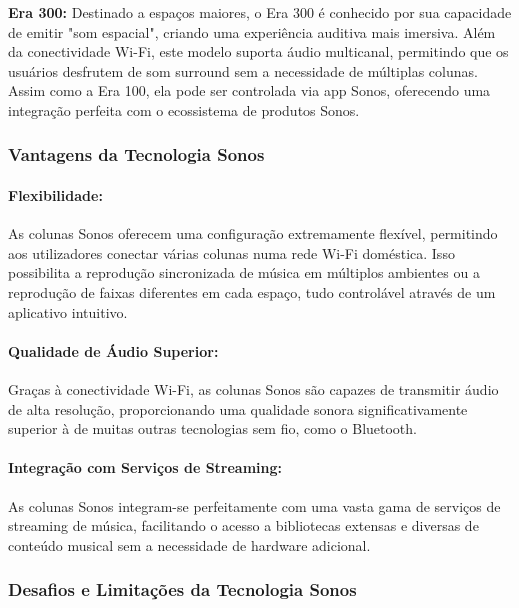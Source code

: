 \documentclass{article}
\begin{document}
\vspace{0.2cm}

\textbf{Era 300:} Destinado a espaços maiores, o Era 300 é conhecido por sua capacidade de emitir "som espacial", criando uma experiência auditiva mais imersiva. Além da conectividade Wi-Fi, este modelo suporta áudio multicanal, permitindo que os usuários desfrutem de som surround sem a necessidade de múltiplas colunas. Assim como a Era 100, ela pode ser controlada via app Sonos, oferecendo uma integração perfeita com o ecossistema de produtos Sonos.
\vspace{1cm}

\subsubsection{Vantagens da Tecnologia Sonos}
\vspace{0.2cm}
\paragraph{Flexibilidade:} As colunas Sonos oferecem uma configuração extremamente flexível, permitindo aos utilizadores conectar várias colunas numa rede Wi-Fi doméstica. Isso possibilita a reprodução sincronizada de música em múltiplos ambientes ou a reprodução de faixas diferentes em cada espaço, tudo controlável através de um aplicativo intuitivo.

\paragraph{Qualidade de Áudio Superior:} Graças à conectividade Wi-Fi, as colunas Sonos são capazes de transmitir áudio de alta resolução, proporcionando uma qualidade sonora significativamente superior à de muitas outras tecnologias sem fio, como o Bluetooth.

\paragraph{Integração com Serviços de Streaming:} As colunas Sonos integram-se perfeitamente com uma vasta gama de serviços de streaming de música, facilitando o acesso a bibliotecas extensas e diversas de conteúdo musical sem a necessidade de hardware adicional.

\newpage
\vspace{1cm}
\subsubsection{Desafios e Limitações da Tecnologia Sonos}
\vspace{0.2cm}
\end{document}
